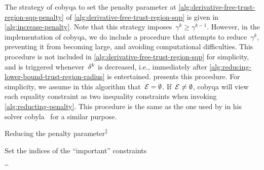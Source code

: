 The strategy of \gls{cobyqa} to set the penalty parameter at \cref{alg:derivative-free-trust-region-sqp-penalty} of \cref{alg:derivative-free-trust-region-sqp} is given in \cref{alg:increase-penalty}.
Note that this strategy imposes~$\gamma^k \ge \gamma^{k - 1}$.
However, in the implementation of \gls{cobyqa}, we do include a procedure that attempts to reduce~$\gamma^k$, preventing it from becoming large, and avoiding computational difficulties.
This procedure is not included in \cref{alg:derivative-free-trust-region-sqp} for simplicity, and is triggered whenever~$\radlb[k]$ is decreased, i.e., immediately after \cref{alg:reducing-lower-bound-trust-region-radius} is entertained.
 presents this procedure.
For simplicity, we assume in this algorithm that~$\mathcal{E} = \emptyset$.
If~$\mathcal{E} \neq \emptyset$, \gls{cobyqa} will view each equality constraint as two inequality constraints when invoking \cref{alg:reducting-penalty}.
This procedure is the same as the one used by \citeauthor{Powell_1994} in his solver \gls{cobyla}~\cite{Powell_1994} for a similar purpose.

\begin{algorithm}
    \caption[Reducing the penalty parameter]{Reducing the penalty parameter\textsuperscript{$\ddagger$}}
    \label{alg:reducting-penalty}
    \DontPrintSemicolon
    \onehalfspacing
    Set the indices of the \enquote{important} constraints
    \begin{algomathdisplay}
        \iub^{\ast} \eqdef {}
    \end{algomathdisplay}
\end{algorithm}
%

